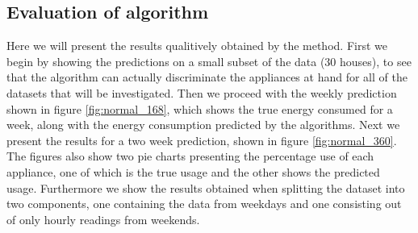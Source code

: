 \subsection{Evaluation of algorithm}

\label{sec:evaluation}
Here we will present the results qualitively obtained by the method. First we begin by showing the predictions on a small subset of the data (30 houses), to see that the algorithm can actually discriminate the appliances at hand for all of the datasets that will be investigated. Then we proceed with the weekly prediction shown in figure \ref{fig:normal_168}, which shows the true energy consumed for a week, along with the energy consumption predicted by the algorithms. Next we present the results for a two week prediction, shown in figure \ref{fig:normal_360}. The figures also show two pie charts presenting the percentage use of each appliance, one of which is the true usage and the other shows the predicted usage. Furthermore we show the results obtained when splitting the dataset into two components, one containing the data from weekdays and one consisting out of only hourly readings from weekends.

